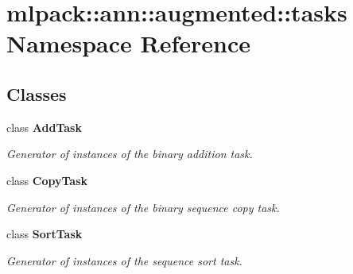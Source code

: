 \section{mlpack\+:\+:ann\+:\+:augmented\+:\+:tasks Namespace Reference}
\label{namespacemlpack_1_1ann_1_1augmented_1_1tasks}
\subsection*{Classes}
\begin{DoxyCompactItemize}
\item 
class \textbf{ Add\+Task}
\begin{DoxyCompactList}\small\item\em Generator of instances of the binary addition task. \end{DoxyCompactList}\item 
class \textbf{ Copy\+Task}
\begin{DoxyCompactList}\small\item\em Generator of instances of the binary sequence copy task. \end{DoxyCompactList}\item 
class \textbf{ Sort\+Task}
\begin{DoxyCompactList}\small\item\em Generator of instances of the sequence sort task. \end{DoxyCompactList}\end{DoxyCompactItemize}

